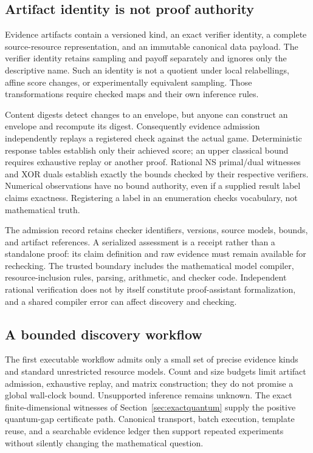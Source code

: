 \subsection{Artifact identity is not proof authority}
Evidence artifacts contain a versioned kind, an exact verifier identity, a
complete source-resource representation, and an immutable canonical data
payload. The verifier identity retains sampling and payoff separately and
ignores only the descriptive name. Such an identity is not a quotient under
local relabellings, affine score changes, or experimentally equivalent sampling.
Those transformations require checked maps and their own inference rules.

Content digests detect changes to an envelope, but anyone can construct an
envelope and recompute its digest. Consequently evidence admission independently
replays a registered check against the actual game. Deterministic response
tables establish only their achieved score; an upper classical bound requires
exhaustive replay or another proof. Rational NS primal/dual witnesses and XOR
duals establish exactly the bounds checked by their respective verifiers.
Numerical observations have no bound authority, even if a supplied result label
claims exactness. Registering a label in an enumeration checks vocabulary, not
mathematical truth.

The admission record retains checker identifiers, versions, source models,
bounds, and artifact references. A serialized assessment is a receipt rather
than a standalone proof: its claim definition and raw evidence must remain
available for rechecking. The trusted boundary includes the mathematical model
compiler, resource-inclusion rules, parsing, arithmetic, and checker code.
Independent rational verification does not by itself constitute proof-assistant
formalization, and a shared compiler error can affect discovery and checking.

\subsection{A bounded discovery workflow}
The first executable workflow admits only a small set of precise evidence
kinds and standard unrestricted resource models. Count and size budgets limit
artifact admission, exhaustive replay, and matrix construction; they do not
promise a global wall-clock bound. Unsupported inference remains unknown.
The exact finite-dimensional witnesses of Section~\ref{sec:exactquantum} supply
the positive quantum-gap certificate path. Canonical transport, batch
execution, template reuse, and a searchable evidence ledger then support
repeated experiments without silently changing the mathematical question.
